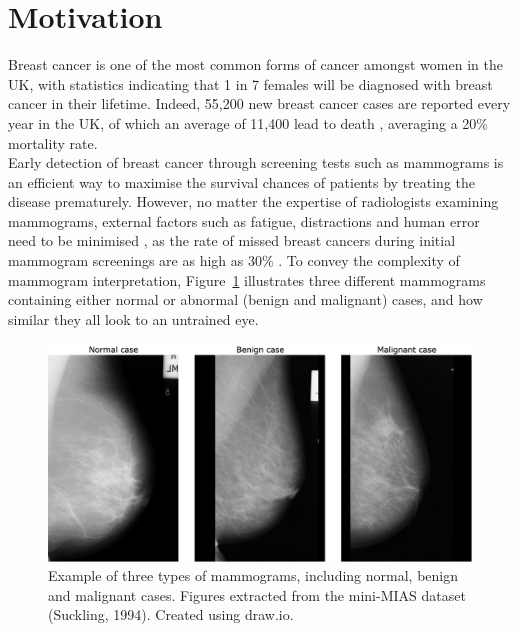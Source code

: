 \section{Motivation}

Breast cancer is one of the most common forms of cancer amongst women in the UK, with statistics indicating that 1 in 7 females will be diagnosed with breast cancer in their lifetime. Indeed, 55,200 new breast cancer cases are reported every year in the UK, of which an average of 11,400 lead to death \citep{BreastCancerResearchUK}, averaging a 20\% mortality rate.\\

Early detection of breast cancer through screening tests such as mammograms is an efficient way to maximise the survival chances of patients by treating the disease prematurely. However, no matter the expertise of radiologists examining mammograms, external factors such as fatigue, distractions and human error need to be minimised \citep{Polat2007}, as the rate of missed breast cancers during initial mammogram screenings  are as high as 30\% \citep{Elter2009}. To convey the complexity of mammogram interpretation, Figure~\ref{fig:introduction-mammogram-examples} illustrates three different mammograms containing either normal or abnormal (benign and malignant) cases, and how similar they all look to an untrained eye.\\

\begin{figure}[ht]
\centerline{\includegraphics[width=\textwidth]{figures/introduction/mammogram examples.png}}
\caption{\label{fig:introduction-mammogram-examples}Example of three types of mammograms, including normal, benign and malignant cases. Figures extracted from the mini-MIAS dataset (Suckling, 1994). Created using draw.io.}
\end{figure}

